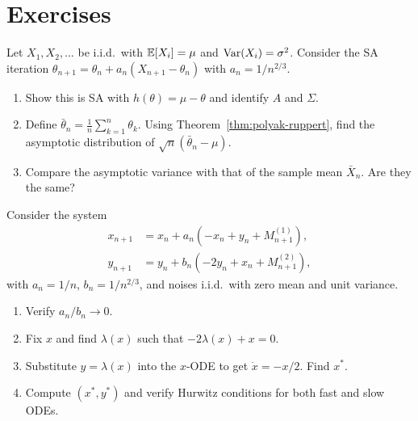 \documentclass[11pt,a4paper]{article}
\begin{document}
\section{Exercises}
\label{sec:exercises}

\begin{exercise}
\label{ex:polyak-ruppert}
Let $X_1, X_2, \ldots$ be i.i.d.\ with $\mathbb{E}[X_i] = \mu$ and
$\operatorname{Var}(X_i) = \sigma^2$. Consider the SA iteration
$\theta_{n+1} = \theta_n + a_n(X_{n+1} - \theta_n)$ with
$a_n = 1/n^{2/3}$.
\begin{enumerate}[label=(\alph*)]
  \item Show this is SA with $h(\theta) = \mu - \theta$ and identify
    $A$ and $\Sigma$.
  \item Define $\bar{\theta}_n = \frac{1}{n}\sum_{k=1}^n \theta_k$.
    Using Theorem~\ref{thm:polyak-ruppert}, find the asymptotic
    distribution of $\sqrt{n}(\bar{\theta}_n - \mu)$.
  \item Compare the asymptotic variance with that of the sample mean
    $\bar{X}_n$. Are they the same?
\end{enumerate}
\end{exercise}

\begin{exercise}
\label{ex:two-timescale-sep}
Consider the system
\begin{align*}
  x_{n+1} &= x_n + a_n(-x_n + y_n + M_{n+1}^{(1)}), \\
  y_{n+1} &= y_n + b_n(-2y_n + x_n + M_{n+1}^{(2)}),
\end{align*}
with $a_n = 1/n$, $b_n = 1/n^{2/3}$, and noises i.i.d.\ with zero
mean and unit variance.
\begin{enumerate}[label=(\alph*)]
  \item Verify $a_n/b_n \to 0$.
  \item Fix $x$ and find $\lambda(x)$ such that
    $-2\lambda(x) + x = 0$.
  \item Substitute $y = \lambda(x)$ into the $x$-ODE to get
    $\dot{x} = -x/2$. Find $x^*$.
  \item Compute $(x^*, y^*)$ and verify Hurwitz conditions for both
    fast and slow ODEs.
\end{enumerate}
\end{exercise}
\end{document}
